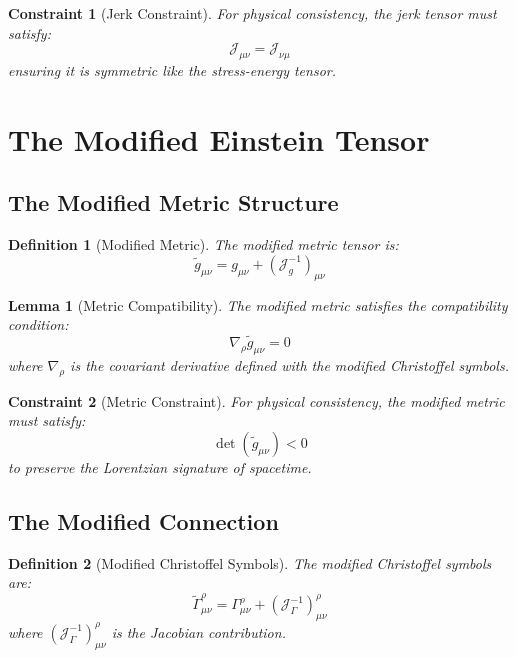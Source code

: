 \documentclass{article}
\newcommand{\tl}[1]{\tilde{#1}}
\newtheorem{lemma}{Lemma}
\newtheorem{definition}{Definition}
\newtheorem{constraint}{Constraint}
\begin{document}
\begin{constraint}[Jerk Constraint]
For physical consistency, the jerk tensor must satisfy:
\begin{equation}
\mathcal{J}_{\mu\nu} = \mathcal{J}_{\nu\mu}
\end{equation}
ensuring it is symmetric like the stress-energy tensor.
\end{constraint}

\section{The Modified Einstein Tensor}

\subsection{The Modified Metric Structure}

\begin{definition}[Modified Metric]
The modified metric tensor is:
\begin{equation}
\tl{g}_{\mu\nu} = g_{\mu\nu} + (\mathcal{J}^{-1}_g)_{\mu\nu}
\end{equation}
\end{definition}

\begin{lemma}[Metric Compatibility]
The modified metric satisfies the compatibility condition:
\begin{equation}
\nabla_{\rho} \tl{g}_{\mu\nu} = 0
\end{equation}
where $\nabla_{\rho}$ is the covariant derivative defined with the modified Christoffel symbols.
\end{lemma}

\begin{constraint}[Metric Constraint]
For physical consistency, the modified metric must satisfy:
\begin{equation}
\det(\tl{g}_{\mu\nu}) < 0
\end{equation}
to preserve the Lorentzian signature of spacetime.
\end{constraint}

\subsection{The Modified Connection}

\begin{definition}[Modified Christoffel Symbols]
The modified Christoffel symbols are:
\begin{equation}
\tl{\Gamma}^{\rho}_{\mu\nu} = \Gamma^{\rho}_{\mu\nu} + (\mathcal{J}^{-1}_{\Gamma})^{\rho}_{\mu\nu}
\end{equation}
where $(\mathcal{J}^{-1}_{\Gamma})^{\rho}_{\mu\nu}$ is the Jacobian contribution.
\end{definition}
\end{document}
